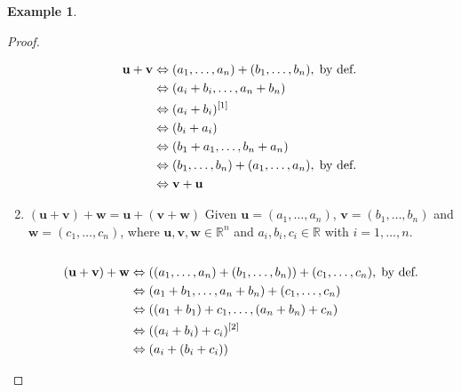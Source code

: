 \documentclass{article}
\theoremstyle{plain}
\theoremstyle{definition}
\newtheorem{example}{Example}[section]
\theoremstyle{remark}
\begin{document}
\begin{example}
\begin{proof}
\begin{enumerate}[label=(V\arabic*),leftmargin=*]
                \[
                \begin{aligned}
                    \mathbf{u} + \mathbf{v} &\Leftrightarrow (a_1, \ldots, a_n) + (b_1, \ldots, b_n), \;\text{by def.}\; \\
                                            &\Leftrightarrow (a_i + b_i, \ldots, a_n + b_n) \\
                                            &\Leftrightarrow (a_i + b_i) \textsuperscript{[1]} \\
                                            &\Leftrightarrow (b_i + a_i) \\
                                            &\Leftrightarrow (b_1 + a_1, \ldots, b_n + a_n) \\
                                            &\Leftrightarrow (b_1, \ldots, b_n) + (a_1, \ldots, a_n), \;\text{by def.}\; \\
                                            &\Leftrightarrow \mathbf{v} + \mathbf{u}
                \end{aligned}
                \] 
            \item $(\mathbf{u} + \mathbf{v}) + \mathbf{w} = \mathbf{u} + (\mathbf{v} + \mathbf{w})$
                Given $\mathbf{u} = (a_1, \ldots, a_n)$, $\mathbf{v} = (b_1, \ldots, b_n)$ and $\mathbf{w} = (c_1, \ldots, c_n)$, where $\mathbf{u}, \mathbf{v}, \mathbf{w} \in \mathbb{R}^n$ and $a_i, b_i, c_i \in \mathbb{R}$ with $i = 1, \ldots, n$. \\
                \\
                \[
                \begin{aligned}
                    (\mathbf{u} + \mathbf{v}) + \mathbf{w} &\Leftrightarrow ((a_1, \ldots, a_n) + (b_1, \ldots, b_n)) + (c_1, \ldots, c_n), \;\text{by def.} \\
                                                           &\Leftrightarrow (a_1 + b_1, \ldots, a_n + b_n) + (c_1, \ldots, c_n) \\
                                                           &\Leftrightarrow ((a_1 + b_1) + c_1, \ldots, (a_n + b_n) + c_n) \\
                                                           &\Leftrightarrow ((a_i + b_i) + c_i) \textsuperscript{[2]} \\
                                                           &\Leftrightarrow (a_i + (b_i + c_i)) \\

\end{aligned}\]
\end{enumerate}
\end{proof}
\end{example}
\end{document}
